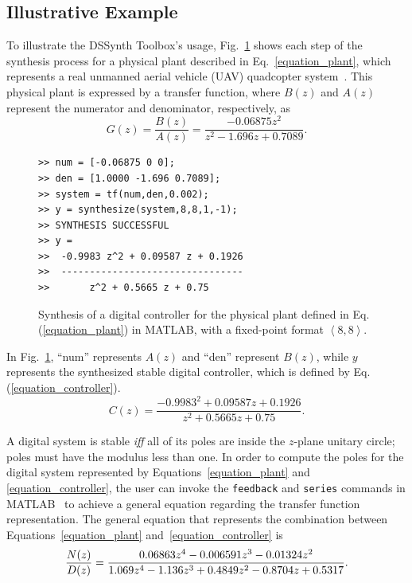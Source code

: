 \documentclass[10pt,conference]{IEEEtran}
\newcommand\tool{{DSSynth Toolbox}\xspace}
\begin{document}
\subsection{Illustrative Example}

To illustrate the \tool's usage, Fig.~\ref{toolbox-usage} shows each step of the 
synthesis process for a physical plant described in Eq.~\eqref{equation_plant},
which represents a real unmanned aerial vehicle (UAV) quadcopter system~\cite{bouabdallah}. 
This physical plant is expressed by a transfer function, where 
$B(z)$ and $A(z)$ represent the numerator and denominator, respectively, as
%
\begin{equation}
\label{equation_plant}
G(z)=\frac{B(z)}{A(z)}=\frac{-0.06875z^{2}}{z^2-1.696z+0.7089}.
\end{equation}

\begin{figure}[ht]
\scriptsize
\begin{lstlisting}[xleftmargin=.025\textwidth,xrightmargin=.025\textwidth, frame=single,]
>> num = [-0.06875 0 0];
>> den = [1.0000 -1.696 0.7089];
>> system = tf(num,den,0.002);
>> y = synthesize(system,8,8,1,-1);
>> SYNTHESIS SUCCESSFUL
>> y = 
>>  -0.9983 z^2 + 0.09587 z + 0.1926
>>  --------------------------------
>>       z^2 + 0.5665 z + 0.75
\end{lstlisting}
\vspace{-0.2cm}
\caption{Synthesis of a digital controller for the physical plant defined in Eq.(\ref{equation_plant}) in MATLAB, with a fixed-point format  $\left\langle 8,8\right\rangle$.}
\label{toolbox-usage}
\end{figure}

In Fig.~\ref{toolbox-usage}, ``num'' represents $A(z)$ and ``den'' represent $B(z)$, while 
$y$ represents the synthesized stable digital controller, which is defined by Eq.(\ref{equation_controller}).
%
\begin{equation}
\label{equation_controller}
C(z)=\frac{-0.9983^{2}+0.09587z+0.1926}{z^2+0.5665z+0.75}.
\end{equation}

A digital system is stable \textit{iff} all of its poles are inside the $z$-plane unitary circle; 
poles must have the modulus less than one. In order to compute the poles for the digital 
system represented by Equations~\eqref{equation_plant} and \eqref{equation_controller}, 
the user can invoke the \texttt{feedback} and \texttt{series} commands in MATLAB~\cite{matlab-toolbox} 
to achieve a general equation regarding the transfer function representation. 
The general equation that represents the combination between Equations~\eqref{equation_plant}
and~\eqref{equation_controller} is
%
\begin{equation}
\small
\label{equation_general}
\frac{N(z)}{D(z)}=\frac{0.06863z^{4} - 0.006591z^{3} - 0.01324z^{2}}{1.069z^{4} - 1.136z^{3} + 0.4849z^{2} -0.8704z + 0.5317}.
\end{equation}
 
\end{document}
